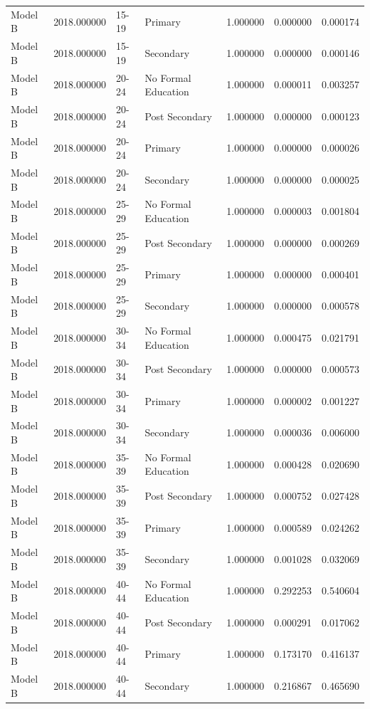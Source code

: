 \begin{table}[ht]
\begin{tabular}{lrllrrr}
Model B & 2018.000000 & 15-19 & Primary & 1.000000 & 0.000000 & 0.000174 \\
Model B & 2018.000000 & 15-19 & Secondary & 1.000000 & 0.000000 & 0.000146 \\
Model B & 2018.000000 & 20-24 & No Formal Education & 1.000000 & 0.000011 & 0.003257 \\
Model B & 2018.000000 & 20-24 & Post Secondary & 1.000000 & 0.000000 & 0.000123 \\
Model B & 2018.000000 & 20-24 & Primary & 1.000000 & 0.000000 & 0.000026 \\
Model B & 2018.000000 & 20-24 & Secondary & 1.000000 & 0.000000 & 0.000025 \\
Model B & 2018.000000 & 25-29 & No Formal Education & 1.000000 & 0.000003 & 0.001804 \\
Model B & 2018.000000 & 25-29 & Post Secondary & 1.000000 & 0.000000 & 0.000269 \\
Model B & 2018.000000 & 25-29 & Primary & 1.000000 & 0.000000 & 0.000401 \\
Model B & 2018.000000 & 25-29 & Secondary & 1.000000 & 0.000000 & 0.000578 \\
Model B & 2018.000000 & 30-34 & No Formal Education & 1.000000 & 0.000475 & 0.021791 \\
Model B & 2018.000000 & 30-34 & Post Secondary & 1.000000 & 0.000000 & 0.000573 \\
Model B & 2018.000000 & 30-34 & Primary & 1.000000 & 0.000002 & 0.001227 \\
Model B & 2018.000000 & 30-34 & Secondary & 1.000000 & 0.000036 & 0.006000 \\
Model B & 2018.000000 & 35-39 & No Formal Education & 1.000000 & 0.000428 & 0.020690 \\
Model B & 2018.000000 & 35-39 & Post Secondary & 1.000000 & 0.000752 & 0.027428 \\
Model B & 2018.000000 & 35-39 & Primary & 1.000000 & 0.000589 & 0.024262 \\
Model B & 2018.000000 & 35-39 & Secondary & 1.000000 & 0.001028 & 0.032069 \\
Model B & 2018.000000 & 40-44 & No Formal Education & 1.000000 & 0.292253 & 0.540604 \\
Model B & 2018.000000 & 40-44 & Post Secondary & 1.000000 & 0.000291 & 0.017062 \\
Model B & 2018.000000 & 40-44 & Primary & 1.000000 & 0.173170 & 0.416137 \\
Model B & 2018.000000 & 40-44 & Secondary & 1.000000 & 0.216867 & 0.465690 \\

\end{tabular}
\end{table}
